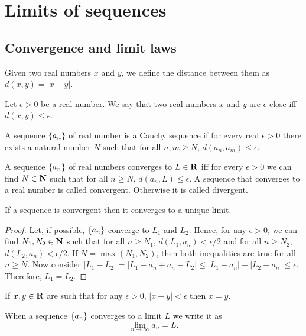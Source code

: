 \chapter{Limits of sequences}\label{c5}
\section{Convergence and limit laws}\label{c5s1}
\begin{defn}\label{c5s1d1}
Given two real numbers $x$ and $y$, we define the distance between them as
$d(x, y) = |x - y|$.
\end{defn}
\begin{defn}\label{c5s1d2}
Let $\epsilon > 0$ be a real number. We say that two real numbers $x$ and $y$
are $\epsilon$-close iff $d(x, y) \le \epsilon$.
\end{defn}
\begin{defn}\label{c5s1d3}
A sequence $\{a_n\}$ of real number is a Cauchy sequence if for every
real $\epsilon > 0$ there exists a natural number $N$ such that for all
$n, m \ge N$, $d(a_n, a_m) \le \epsilon$.
\end{defn}
\begin{defn}\label{c5s1d4}
A sequence $\{a_n\}$ of real numbers converges to $L \in \mathbf{R}$ iff for
every $\epsilon > 0$ we can find $N \in \mathbf{N}$ such that for all $n \ge N$,
$d(a_n, L) \le \epsilon$. A sequence that converges to a real number is 
called convergent. Otherwise it is called divergent.
\end{defn}

\begin{prop}\label{c5s1p1}
If a sequence is convergent then it converges to a unique limit.
\end{prop}
\begin{proof}
Let, if possible, $\{a_n\}$ converge to $L_1$ and $L_2$. Hence, for any 
$\epsilon > 0$, we can find $N_1, N_2 \in \mathbf{N}$ such that for all $n \ge 
N_1$, $d(L_1, a_n) < \epsilon/2$ and for all $n \ge N_2$, $d(L_2, a_n) <
\epsilon/2$. If $N = \max(N_1, N_2)$, then both inequalities are true for
all $n \ge N$. Now consider $|L_1 - L_2| = |L_1 - a_n + a_n - L_2| \le
|L_1 - a_n| + |L_2 - a_n| \le \epsilon$. Therefore, $L_1 = L_2$.
\end{proof}
\begin{rem}
If $x, y \in \mathbf{R}$ are such that for any $\epsilon > 0$, $|x - y| < \epsilon$
then $x = y$.
\end{rem}

When a sequence $\{a_n\}$ converges to a limit $L$ we write it as
\[
\lim_{n \rightarrow \infty} a_n = L.
\]

